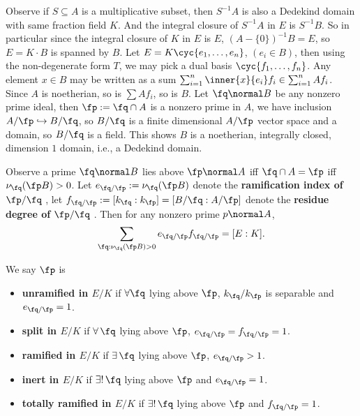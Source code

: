\documentclass[11pt]{amsart}
\begin{document}
Observe if $S \subseteq A$ is a multiplicative subset, then $S^{-1} A$ is also a
Dedekind domain with same fraction field $K$. And the integral closure of
$S^{-1} A$ in $E$ is $S^{-1} B$.  So in particular since the integral closure of
$K$ in $E$ is $E$, $(A - \{0\})^{-1} B = E$, so $E = K \cdot B$ is spanned by
$B$.  Let $E = K \cyc{e_1, \ldots, e_n}$, $(e_i \in B)$, then using the
non-degenerate form $T$, we may pick a dual basis $\cyc{f_1, \ldots, f_n}$.  Any
element $x \in B$ may be written as a sum $\sum_{i=1}^{n} \inner{x}{e_i} f_i \in
\sum_{i=1}^{n} Af_i$.  Since $A$ is noetherian, so is $\sum Af_i$, so is $B$.
Let $\fq \normal B$ be any nonzero prime ideal, then $\fp := \fq \cap A$ is a
nonzero prime in $A$, we have inclusion $A/\fp \hookrightarrow B/\fq$, so
$B/\fq$ is a finite dimensional $A/\fp$ vector space and a domain, so $B/\fq$ is
a field.  This shows $B$ is a noetherian, integrally closed, dimension $1$
domain, i.e., a Dedekind domain.

\medskip

Observe a prime $\fq \normal B$ lies above $\fp \normal A$ iff $\fq \cap A =
\fp$ iff $\nu_{\fq}(\fp B) > 0$.  Let $e_{\fq/\fp} := \nu_{\fq}(\fp B)$ denote
the {\bf ramification index of $\fp/\fq$} , let $f_{\fq/\fp} := [k_{\fq} : k_{\fp}] = [B/\fq : A/\fp]$
denote the {\bf residue degree of $\fp/\fq$} .  Then for any nonzero prime $p \normal A$,
\[
    \sum_{\fq : \nu_{\fq}(\fp B) > 0} e_{\fq/\fp} f_{\fq/\fp} = [E : K].
\]

We say $\fp$ is
\begin{itemize}
    \item {\bf unramified in $E/K$}  if
        $\forall \fq$ lying above $\fp$, $k_{\fq}/k_{\fp}$ is separable and
        $e_{\fq/\fp} = 1$.
    \item {\bf split in $E/K$}  if $\forall\, \fq$
        lying above $\fp$, $e_{\fq/\fp} = f_{\fq/\fp} = 1$.
    \item {\bf ramified in $E/K$}  if $\exists\,
        \fq$ lying above $\fp$, $e_{\fq/\fp} > 1$.
    \item {\bf inert in $E/K$}  if $\exists!\, \fq$
        lying above $\fp$ and $e_{\fq/\fp} = 1$.
    \item {\bf totally ramified in $E/K$}  if $\exists!\, \fq$ lying above $\fp$ and $f_{\fq/\fp} = 1$.
\end{itemize}
\end{document}
